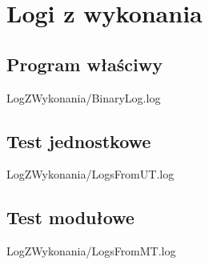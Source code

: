 \chapter{Logi z wykonania}
    \section{Program właściwy}
        
        {LogZWykonania/BinaryLog.log}
    \section{Test jednostkowe}
        
        {LogZWykonania/LogsFromUT.log}
    \section{Test modułowe}
        
        {LogZWykonania/LogsFromMT.log}